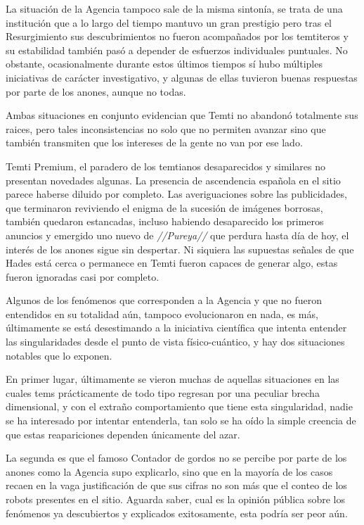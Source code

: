 \documentclass[
  spanish,
]{book}
\begin{document}
La situación de la Agencia tampoco sale de la misma sintonía, se trata de una institución que a lo largo del tiempo mantuvo un gran prestigio pero tras el Resurgimiento sus descubrimientos no fueron acompañados por los temtiteros y su estabilidad también pasó a depender de esfuerzos individuales puntuales. No obstante, ocasionalmente durante estos últimos tiempos sí hubo múltiples iniciativas de carácter investigativo, y algunas de ellas tuvieron buenas respuestas por parte de los anones, aunque no todas.

Ambas situaciones en conjunto evidencian que Temti no abandonó totalmente sus raices, pero tales inconsistencias no solo que no permiten avanzar sino que también transmiten que los intereses de la gente no van por ese lado.

Temti Premium, el paradero de los temtianos desaparecidos y similares no presentan novedades algunas. La presencia de ascendencia española en el sitio parece haberse diluido por completo. Las averiguaciones sobre las publicidades, que terminaron reviviendo el enigma de la sucesión de imágenes borrosas, también quedaron estancadas, incluso habiendo desaparecido los primeros anuncios y emergido uno nuevo de \emph{//Pureya//} que perdura hasta día de hoy, el interés de los anones sigue sin despertar. Ni siquiera las supuestas señales de que Hades está cerca o permanece en Temti fueron capaces de generar algo, estas fueron ignoradas casi por completo.

Algunos de los fenómenos que corresponden a la Agencia y que no fueron entendidos en su totalidad aún, tampoco evolucionaron en nada, es más, últimamente se está desestimando a la iniciativa científica que intenta entender las singularidades desde el punto de vista físico-cuántico, y hay dos situaciones notables que lo exponen.

En primer lugar, últimamente se vieron muchas de aquellas situaciones en las cuales tems prácticamente de todo tipo regresan por una peculiar brecha dimensional, y con el extraño comportamiento que tiene esta singularidad, nadie se ha interesado por intentar entenderla, tan solo se ha oído la simple creencia de que estas reapariciones dependen únicamente del azar.

La segunda es que el famoso Contador de gordos no se percibe por parte de los anones como la Agencia supo explicarlo, sino que en la mayoría de los casos recaen en la vaga justificación de que sus cifras no son más que el conteo de los robots presentes en el sitio. Aguarda saber, cual es la opinión pública sobre los fenómenos ya descubiertos y explicados exitosamente, esta podría ser peor aún.
\end{document}
